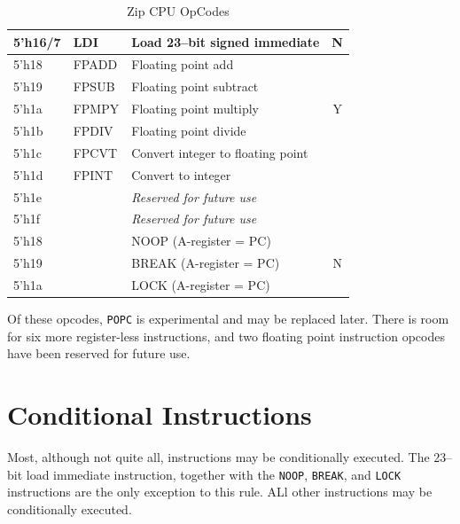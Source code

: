 \documentclass{gqtekspec}
\begin{document}
\begin{table}
\begin{center}
\begin{tabular}{|l|l|l|c|}
5'h16/7 & LDI & Load 23--bit signed immediate & N \\\hline\hline
5'h18 & FPADD & Floating point add &  \\\cline{1-3}
5'h19 & FPSUB & Floating point subtract &   \\\cline{1-3}
5'h1a & FPMPY & Floating point multiply & Y \\\cline{1-3}
5'h1b & FPDIV & Floating point divide &   \\\cline{1-3}
5'h1c & FPCVT & Convert integer to floating point &   \\\cline{1-3}
5'h1d & FPINT & Convert to integer &   \\\hline
5'h1e & & {\em Reserved for future use} &\\\hline
5'h1f & & {\em Reserved for future use} &\\\hline
5'h18 & & NOOP (A-register = PC)&\\\cline{1-3}
5'h19 & & BREAK (A-register = PC)& N\\\cline{1-3}
5'h1a & & LOCK (A-register = PC)&\\\hline
\end{tabular}
\caption{Zip CPU OpCodes}\label{tbl:iset-opcodes}
\end{center}\end{table}
%
Of these opcodes, {\tt POPC} is experimental and may be
replaced later.  There is room for six more register-less instructions,
and two floating point instruction opcodes have been reserved for future use.

\section{Conditional Instructions}
Most, although not quite all, instructions may be conditionally executed.  
The 23--bit load immediate instruction, together with the {\tt NOOP}, 
{\tt BREAK}, and {\tt LOCK} instructions are the only exception to this rule.
ALl other instructions may be conditionally executed.
\end{document}
